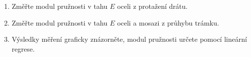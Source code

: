 \documentclass[protokol.tex]{subfiles}
\begin{document}
\begin{enumerate}
\item Změřte modul pružnosti v tahu $E$ oceli z protažení drátu. 
\item Změřte modul pružnosti v tahu $E$ oceli a mosazi z průhybu trámku. 
\item Výsledky měření graficky znázorněte, modul pružnosti určete pomocí lineární regrese. 
\end{enumerate}
\end{document}
